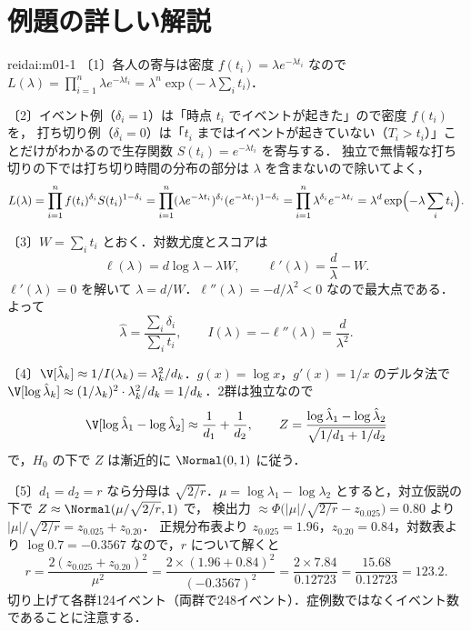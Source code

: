 \section{例題の詳しい解説}\label{sec:m01-kaisetsu}
\begin{kaitou}{reidai:m01-1}
〔1〕各人の寄与は密度 $f(t_i)=\lambda e^{-\lambda t_i}$ なので
$L(\lambda)=\prod_{i=1}^n\lambda e^{-\lambda t_i}=\lambda^n\exp\bigl(-\lambda\sum_it_i\bigr)$．

〔2〕イベント例（$\delta_i=1$）は「時点 $t_i$ でイベントが起きた」ので密度 $f(t_i)$ を，
打ち切り例（$\delta_i=0$）は「$t_i$ まではイベントが起きていない（$T_i>t_i$）」ことだけがわかるので生存関数 $S(t_i)=e^{-\lambda t_i}$ を寄与する．
独立で無情報な打ち切りの下では打ち切り時間の分布の部分は $\lambda$ を含まないので除いてよく，
\[
L(\lambda)=\prod_{i=1}^n f(t_i)^{\delta_i}S(t_i)^{1-\delta_i}=\prod_{i=1}^n(\lambda e^{-\lambda t_i})^{\delta_i}(e^{-\lambda t_i})^{1-\delta_i}=\prod_{i=1}^n\lambda^{\delta_i}e^{-\lambda t_i}=\lambda^{d}\exp\Bigl(-\lambda\sum_it_i\Bigr).
\]

〔3〕$W=\sum_it_i$ とおく．対数尤度とスコアは
\[
\ell(\lambda)=d\log\lambda-\lambda W,\qquad \ell'(\lambda)=\frac d\lambda-W .
\]
$\ell'(\lambda)=0$ を解いて $\lambda=d/W$．$\ell''(\lambda)=-d/\lambda^2<0$ なので最大点である．よって
\[
\hat\lambda=\frac{\sum_i\delta_i}{\sum_it_i},\qquad I(\lambda)=-\ell''(\lambda)=\frac{d}{\lambda^2}.
\]

〔4〕$\V[\hat\lambda_k]\approx1/I(\lambda_k)=\lambda_k^2/d_k$．$g(x)=\log x$，$g'(x)=1/x$ のデルタ法で
$\V[\log\hat\lambda_k]\approx(1/\lambda_k)^2\cdot\lambda_k^2/d_k=1/d_k$．2群は独立なので
\[
\V[\log\hat\lambda_1-\log\hat\lambda_2]\approx\frac1{d_1}+\frac1{d_2},\qquad
Z=\frac{\log\hat\lambda_1-\log\hat\lambda_2}{\sqrt{1/d_1+1/d_2}}
\]
で，$H_0$ の下で $Z$ は漸近的に $\Normal(0,1)$ に従う．

〔5〕$d_1=d_2=r$ なら分母は $\sqrt{2/r}$．$\mu=\log\lambda_1-\log\lambda_2$ とすると，対立仮説の下で $Z\approx\Normal(\mu/\sqrt{2/r},1)$ で，
検出力 $\approx\Phi\bigl(|\mu|/\sqrt{2/r}-z_{0.025}\bigr)=0.80$ より $|\mu|/\sqrt{2/r}=z_{0.025}+z_{0.20}$．
正規分布表より $z_{0.025}=1.96$，$z_{0.20}=0.84$，対数表より $\log0.7=-0.3567$ なので，$r$ について解くと
\[
r=\frac{2(z_{0.025}+z_{0.20})^2}{\mu^2}=\frac{2\times(1.96+0.84)^2}{(-0.3567)^2}=\frac{2\times7.84}{0.12723}=\frac{15.68}{0.12723}=123.2 .
\]
切り上げて各群124イベント（両群で248イベント）．症例数ではなくイベント数であることに注意する．
\end{kaitou}

